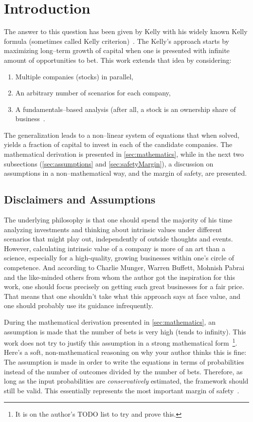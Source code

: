 \documentclass{article}
\begin{document}
\section{Introduction}
\label{sec:introduction}

The answer to this question has been given by Kelly with his widely known Kelly
formula (sometimes called Kelly criterion)~\cite{kelly}. The Kelly's approach
starts by maximizing long--term growth of capital when one is presented with
infinite amount of opportunities to bet. This work extends that idea by
considering:
\begin{enumerate}
    \item Multiple companies (stocks) in parallel,
    \item An arbitrary number of scenarios for each company,
    \item A fundamentals--based analysis (after all, a stock is an ownership
    share of business~\cite{intelligentInvestor}.
\end{enumerate}

The generalization leads to a non--linear system of equations that when solved,
yields a fraction of capital to invest in each of the candidate companies. The
mathematical derivation is presented in \autoref{sec:mathematics}, while in the
next two subsections (\autoref{sec:assumptions} and \autoref{sec:safetyMargin}),
a discussion on assumptions in a non--mathematical way, and the margin of
safety, are presented.

\subsection{Disclaimers and Assumptions}
\label{sec:assumptions}

The underlying philosophy is that one should spend the majority of his time
analyzing investments and thinking about intrinsic values under different
scenarios that might play out, independently of outside thoughts and events.
However, calculating intrinsic value of a company is more of an art than a
science, especially for a high-quality, growing businesses within one's circle
of competence. And according to Charlie Munger, Warren Buffett, Mohnish Pabrai
and the like-minded others from whom the author got the inspiration for this
work, one should focus precisely on getting such great businesses for a fair
price. That means that one shouldn't take what this approach says at face value,
and one should probably use its guidance infrequently.

During the mathematical derivation presented in \autoref{sec:mathematics}, an
assumption is made that the number of bets is very high (tends to infinity).
This work does not try to justify this assumption in a strong mathematical
form~\footnote{It is on the author's TODO list to try and prove this.}. Here's a
soft, non-mathematical reasoning on why your author thinks this is fine: The
assumption is made in order to write the equations in terms of probabilities
instead of the number of outcomes divided by the number of bets. Therefore, as
long as the input probabilities are \textit{conservatively} estimated, the
framework should still be valid. This essentially represents the most important
margin of safety~\cite{intelligentInvestor}.
\end{document}

